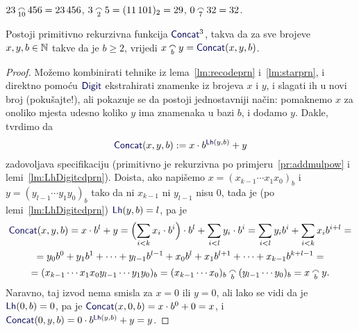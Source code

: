 \begin{primjer}
$23\conc{10}456=23\,456$, $3\conc25=(11\,101)_2=29$, $0\conc732=32$.
\end{primjer}

\begin{lema}\label{lm:Concatprn}
Postoji primitivno rekurzivna funkcija $\f{Concat}^3$, takva da za sve brojeve $x,y,b\in{\mathbb N}$ takve da je $b\ge2$, vrijedi $x\conc by=\f{Concat}(x,y,b)$.
\end{lema}

\begin{proof}
Možemo kombinirati tehnike iz lema~\ref{lm:recodeprn} i~\ref{lm:starprn}, i direktno pomoću $\f{Digit}$ ekstrahirati znamenke iz brojeva $x$ i $y$, i slagati ih u novi broj (pokušajte!), ali pokazuje se da postoji jednostavniji način: pomaknemo $x$ za onoliko mjesta udesno koliko $y$ ima znamenaka u bazi $b$, i dodamo $y$. Dakle, tvrdimo da
\begin{equation}
    \f{Concat}(x,y,b):=x\cdot b^{\f{Lh}(y,b)}+y
\end{equation}
zadovoljava specifikaciju (primitivno je rekurzivna po primjeru~\ref{pr:addmulpow} i lemi~\ref{lm:LhDigitcdprn}). Doista, ako napišemo $x=(x_{k-1}\dotsm x_1x_0)_b$ i $y=(y_{l-1}\dotsm y_1y_0)_b$ tako da ni $x_{k-1}$ ni $y_{l-1}$ nisu $0$, tada je (po lemi~\ref{lm:LhDigitcdprn}) $\f{Lh}(y,b)=l$, pa je
\begin{multline}
    \f{Concat}(x,y,b)=x\cdot b^l+y=\Bigl(\sum_{i<k}x_i\cdot b^i\Bigr)\cdot b^l+\sum_{i<l}y_i\cdot b^i
    =\sum_{i<l}y_ib^i+\sum_{i<k}x_ib^{i+l}=
    \\
    =y_0b^0+y_1b^1+\dotsb+y_{l-1}b^{l-1}+x_0b^l+x_1b^{l+1}+\dotsb+x_{k-1}b^{k+l-1}=\\
    =(x_{k-1}\dotsm x_1x_0y_{l-1}\dotsm y_1y_0)_b=(x_{k-1}\dotsm x_0)_b\conc b(y_{l-1}\dotsm y_0)_b=x\conc b y\text.
\end{multline}
Naravno, taj izvod nema smisla za $x=0$ ili $y=0$, ali lako se vidi da je $\f{Lh}(0,b)=0$, pa je
$\f{Concat}(x,0,b)=x\cdot b^0+0=x$, i $\f{Concat}(0,y,b)=0\cdot b^{\f{Lh}(y,b)}+y=y$.
\end{proof}

